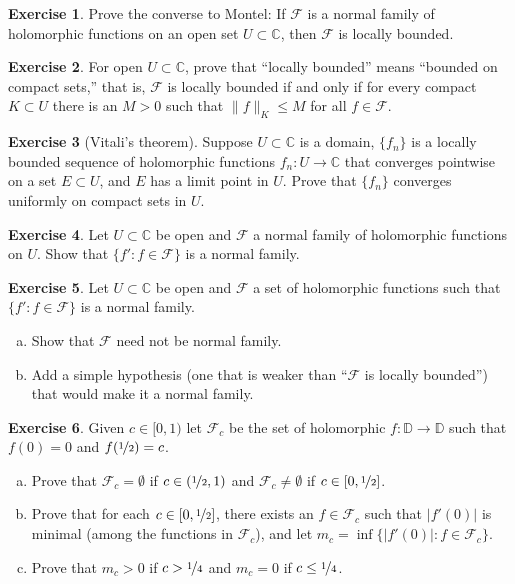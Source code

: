 \documentclass[12pt,openany]{book}
\newcommand{\sabs}[1]{\lvert {#1} \rvert}
\newcommand{\snorm}[1]{\lVert {#1} \rVert}
\newcommand{\C}{{\mathbb{C}}}
\newcommand{\D}{{\mathbb{D}}}
\newcommand{\sF}{{\mathscr{F}}}
\newcommand{\myquote}[1]{``#1''}
\theoremstyle{plain}
\theoremstyle{remark}
\theoremstyle{definition}
\newenvironment{exbox}{%
    \def\FrameCommand{\vrule width 1pt \relax\hspace{10pt}}%
    \MakeFramed{\advance\hsize-\width\FrameRestore}%
}{%
    \endMakeFramed
}
\newenvironment{exparts}{%
    \leavevmode\begin{enumerate}[a),noitemsep,topsep=0pt,parsep=0pt,partopsep=0pt]
}{%
    \end{enumerate}
}
\theoremstyle{exercise}
\newtheorem{exercise}{Exercise}[section]
\theoremstyle{example}
\begin{document}
\begin{exbox}
\begin{exercise}
Prove the converse to Montel:
If $\sF$ is a normal family of holomorphic functions on an open set $U \subset \C$,
then $\sF$ is locally bounded.
\end{exercise}

\begin{exercise}
For open $U \subset \C$,
prove that \myquote{locally bounded} means \myquote{bounded on compact sets,}
that is, $\sF$ is locally bounded if and only if
for every compact $K \subset U$ there is an $M >0$ such that
$\snorm{f}_K \leq M$ for all $f \in \sF$.
\end{exercise}

\begin{exercise}[Vitali's theorem]
Suppose $U \subset \C$ is a domain, $\{ f_n \}$ is a locally bounded
sequence of holomorphic functions $f_n \colon U \to \C$ that
converges pointwise on a set $E \subset U$,
and $E$ has a limit point in $U$.  Prove that $\{ f_n \}$
converges uniformly on compact sets in $U$.
\end{exercise}

\begin{exercise}
Let $U \subset \C$ be open and $\sF$ a normal family of
holomorphic functions on $U$.
Show that $\{ f' : f \in \sF \}$ is a normal family.
\end{exercise}

\begin{exercise}
Let $U \subset \C$ be open and $\sF$ a set of holomorphic
functions such that $\{ f' : f \in \sF \}$ is a normal family.
\begin{exparts}
\item
Show that $\sF$ need not be normal family.
\item
Add a simple
hypothesis (one that is weaker than \myquote{$\sF$ is locally bounded})
that would make it a normal family.
\end{exparts}
\end{exercise}

\begin{exercise}
Given $c \in [0,1)$ let $\sF_c$ be the set of holomorphic
$f \colon \D \to \D$ such that $f(0) = 0$ and $f(\nicefrac{1}{2}) = c$.
\begin{exparts}
\item
Prove that
$\sF_c = \emptyset$ if $c \in (\nicefrac{1}{2},1)$
and
$\sF_c \not= \emptyset$ if $c \in [0,\nicefrac{1}{2}]$.
\item
Prove that for each $c \in [0,\nicefrac{1}{2}]$, there exists an
$f \in \sF_c$
such that $\sabs{f'(0)}$ is minimal (among the functions in $\sF_c$),
and let $m_c = \inf \bigl\{ \sabs{f'(0)} : f \in \sF_c \bigr\}$.
\item
Prove that $m_c > 0$ if $c > \nicefrac{1}{4}$ and $m_c = 0$ if $c \leq \nicefrac{1}{4}$.
\end{exparts}
\end{exercise}


\end{exbox}
\end{document}
